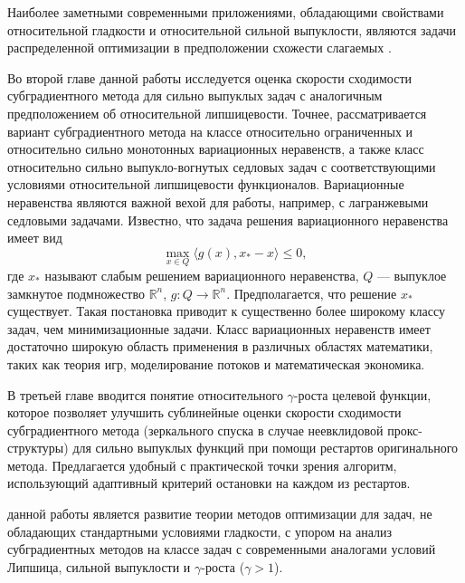 Наиболее заметными современными приложениями, обладающими свойствами относительной гладкости и относительной сильной выпуклости, являются задачи распределенной оптимизации в предположении схожести слагаемых \cite{Hendr}. 

Во второй главе данной работы исследуется оценка скорости сходимости субградиентного метода для сильно выпуклых задач с аналогичным предположением об относительной липшицевости. Точнее, рассматривается вариант субградиентного метода на классе относительно ограниченных и относительно сильно монотонных вариационных неравенств, а также класс относительно сильно выпукло-вогнутых седловых задач с соответствующими условиями относительной липшицевости функционалов. Вариационные неравенства являются важной вехой для работы, например, с лагранжевыми седловыми задачами. Известно, что задача решения вариационного неравенства имеет вид
$$
    \max_{x \in Q} \langle g(x), x_* - x \rangle \leq 0,
$$
где $x_*$ называют слабым решением вариационного неравенства, $Q$ --- выпуклое замкнутое подмножество $\mathbb{R}^n$, $g: Q \longrightarrow \mathbb{R}^n$. Предполагается, что решение $x_*$ существует. Такая постановка приводит к существенно более широкому классу задач, чем минимизационные задачи. Класс вариационных неравенств имеет достаточно широкую область применения в различных областях математики, таких как теория игр, моделирование потоков и математическая экономика. 

В третьей главе вводится понятие относительного $\gamma$-роста целевой функции, которое позволяет улучшить сублинейные оценки скорости сходимости субградиентного метода (зеркального спуска в случае неевклидовой прокс-структуры) для сильно выпуклых функций при помощи рестартов оригинального метода. Предлагается удобный с практической точки зрения алгоритм, использующий адаптивный критерий остановки на каждом из рестартов. 


{\aim} данной работы является развитие теории методов оптимизации для задач, не обладающих стандартными условиями гладкости, с упором на анализ субградиентных методов на классе задач с современными аналогами условий Липшица, сильной выпуклости и $\gamma$-роста ($\gamma > 1$).

